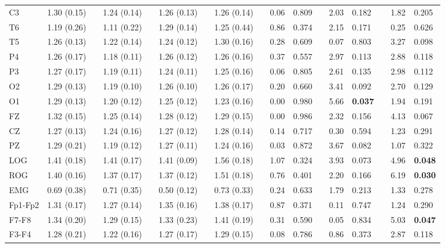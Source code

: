 \documentclass[10pt]{article}
\begin{document}
\begin{table}
\begin{small}
\begin{tabular}{lllllllllllllllll}
C3       & 1.30 (0.15)&  & 1.24 (0.14)&  & 1.26 (0.13)&  & 1.26 (0.14)&  & 0.06 & 0.809 &  & 2.03 & 0.182 &  & 1.82 & 0.205 \\
T6       & 1.19 (0.26)&  & 1.11 (0.22)&  & 1.29 (0.14)&  & 1.25 (0.44)&  & 0.86 & 0.374 &  & 2.15 & 0.171 &  & 0.25 & 0.626 \\
T5       & 1.26 (0.13)&  & 1.22 (0.14)&  & 1.24 (0.12)&  & 1.30 (0.16)&  & 0.28 & 0.609 &  & 0.07 & 0.803 &  & 3.27 & 0.098 \\
P4       & 1.26 (0.17)&  & 1.18 (0.11)&  & 1.26 (0.12)&  & 1.26 (0.16)&  & 0.37 & 0.557 &  & 2.97 & 0.113 &  & 2.88 & 0.118 \\
P3       & 1.27 (0.17)&  & 1.19 (0.11)&  & 1.24 (0.11)&  & 1.25 (0.16)&  & 0.06 & 0.805 &  & 2.61 & 0.135 &  & 2.98 & 0.112 \\
O2       & 1.29 (0.13)&  & 1.19 (0.10)&  & 1.26 (0.10)&  & 1.26 (0.17)&  & 0.20 & 0.660 &  & 3.41 & 0.092 &  & 2.70 & 0.129 \\
O1       & 1.29 (0.13)&  & 1.20 (0.12)&  & 1.25 (0.12)&  & 1.23 (0.16)&  & 0.00 & 0.980 &  & 5.66 &\bf 0.037 &  & 1.94 & 0.191 \\
FZ       & 1.32 (0.15)&  & 1.25 (0.14)&  & 1.28 (0.12)&  & 1.29 (0.15)&  & 0.00 & 0.986 &  & 2.32 & 0.156 &  & 4.13 & 0.067 \\
CZ       & 1.27 (0.13)&  & 1.24 (0.16)&  & 1.27 (0.12)&  & 1.28 (0.14)&  & 0.14 & 0.717 &  & 0.30 & 0.594 &  & 1.23 & 0.291 \\
PZ       & 1.29 (0.21)&  & 1.19 (0.12)&  & 1.27 (0.11)&  & 1.24 (0.16)&  & 0.03 & 0.872 &  & 3.67 & 0.082 &  & 1.07 & 0.322 \\
LOG      & 1.41 (0.18)&  & 1.41 (0.17)&  & 1.41 (0.09)&  & 1.56 (0.18)&  & 1.07 & 0.324 &  & 3.93 & 0.073 &  & 4.96 &\bf 0.048 \\
ROG      & 1.40 (0.16)&  & 1.37 (0.17)&  & 1.37 (0.12)&  & 1.51 (0.18)&  & 0.76 & 0.401 &  & 2.20 & 0.166 &  & 6.19 &\bf 0.030 \\
EMG      & 0.69 (0.38)&  & 0.71 (0.35)&  & 0.50 (0.12)&  & 0.73 (0.33)&  & 0.24 & 0.633 &  & 1.79 & 0.213 &  & 1.33 & 0.278 \\
\midrule
Fp1-Fp2  & 1.31 (0.17)&  & 1.27 (0.14)&  & 1.35 (0.16)&  & 1.38 (0.17)&  & 0.87 & 0.371 &  & 0.11 & 0.747 &  & 1.24 & 0.290 \\
F7-F8    & 1.34 (0.20)&  & 1.29 (0.15)&  & 1.33 (0.23)&  & 1.41 (0.19)&  & 0.31 & 0.590 &  & 0.05 & 0.834 &  & 5.03 &\bf 0.047 \\
F3-F4    & 1.28 (0.21)&  & 1.22 (0.16)&  & 1.27 (0.17)&  & 1.29 (0.15)&  & 0.08 & 0.786 &  & 0.86 & 0.373 &  & 2.87 & 0.118 \\

\end{tabular}
\end{small}
\end{table}
\end{document}
